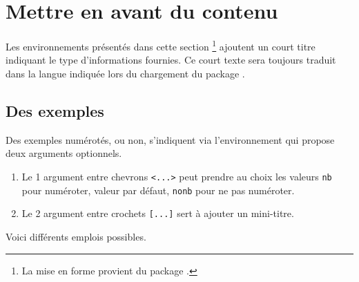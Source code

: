 

\usepackage[lang = french]{../main/main}
\usepackage{../macroenv/macroenv}
\usepackage{../showcase/showcase}
\usepackage{../listing/listing}
\usepackage{../inenglish/inenglish}


\usepackage{focus}




\section{Mettre en avant du contenu}

\begin{bdocnote}
	Les environnements présentés dans cette section
	\footnote{
		La mise en forme provient du package .
	}
	ajoutent un court titre indiquant le type d'informations fournies.
	Ce court texte sera toujours traduit dans la langue indiquée lors du chargement du package .
\end{bdocnote}




\subsection{Des exemples}

Des exemples numérotés, ou non, s'indiquent via l'environnement  qui propose deux arguments optionnels.

\begin{enumerate}
	\item Le 1\ier{} argument entre chevrons \verb#<...># peut prendre au choix les valeurs \verb#nb# pour numéroter, valeur par défaut, \verb#nonb# pour ne pas numéroter.

	\item Le 2\ieme{} argument entre crochets \verb#[...]# sert à ajouter un mini-titre.
\end{enumerate}


Voici différents emplois possibles.







